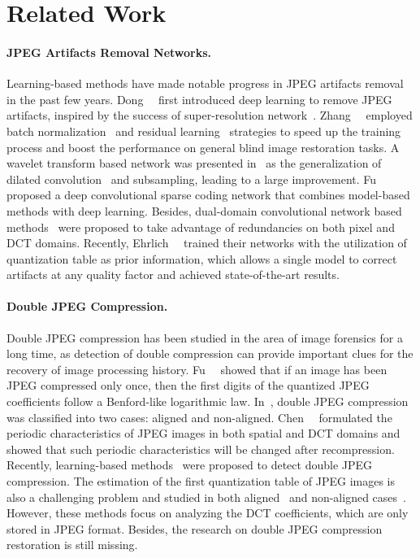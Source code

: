 \documentclass[10pt,twocolumn,letterpaper]{article}
\begin{document}
\section{Related Work}

\paragraph{JPEG Artifacts Removal Networks.} Learning-based methods have made notable progress in JPEG artifacts removal in the past few years. Dong~\etal~\cite{dong2015compression} first introduced deep learning to remove JPEG artifacts, inspired by the success of super-resolution network~\cite{dong2014learning}. Zhang~\etal~\cite{zhang2017beyond} employed batch normalization~\cite{ioffe2015batch} and residual learning~\cite{he2016deep} strategies to speed up the training process and boost the performance on general blind image restoration tasks. A wavelet transform based network was presented in~\cite{Liu_2018_CVPR_Workshops} as the generalization of dilated convolution~\cite{yu2015multi} and subsampling, leading to a large improvement. Fu~\etal~\cite{fu2019jpeg} proposed a deep convolutional sparse coding network that combines model-based methods with deep learning.
Besides, dual-domain convolutional network based methods~\cite{guo2016building, kim2020agarnet, zhang2018dmcnn, zheng2019implicit} were proposed to take advantage of redundancies on both pixel and DCT domains. Recently, Ehrlich~\etal~\cite{ehrlich2020quantization} trained their networks with the utilization of quantization table as prior information, which allows a single model to correct artifacts at any quality factor and achieved state-of-the-art results. 

\paragraph{Double JPEG Compression.} Double JPEG compression has been studied in the area of image forensics for a long time, as detection of double compression can provide important clues for the recovery of image processing history. Fu~\etal~\cite{fu2007generalized} showed that if an image has been JPEG compressed only once, then the first digits of the quantized JPEG coefficients follow a Benford-like logarithmic law. 
In~\cite{barni2010identification, bianchi2011analysis, chen2011detecting, luo2007novel}, double JPEG compression was classified into two cases: aligned and non-aligned. Chen~\etal~\cite{chen2011detecting} formulated the periodic characteristics of JPEG images in both spatial and DCT domains and showed that such periodic characteristics will be changed after recompression. Recently, learning-based methods~\cite{barni2017aligned, park2018double, wang2016double} were proposed to detect double JPEG compression. The estimation of the first quantization table of JPEG images is also a challenging problem and studied in both aligned~\cite{galvan2014first, pasquini2014multiple, xue2017mse, yu2016improved} and non-aligned cases~\cite{bianchi2012image, dalmia2018robust, yao2020improved}. However, these methods focus on analyzing the DCT coefficients, which are only stored in JPEG format. Besides, the research on double JPEG compression restoration is still missing.
\end{document}
